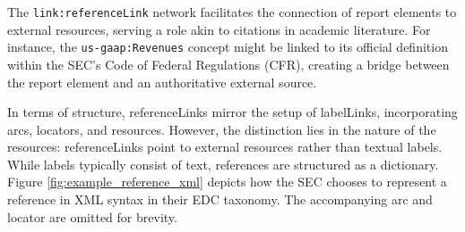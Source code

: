 


The \texttt{link:referenceLink} network facilitates the connection of report elements to external resources, serving a role akin to citations in academic literature.  
For instance, the \texttt{us-gaap:Revenues} concept might be linked to its official definition within the SEC's Code of Federal Regulations (CFR),  
creating a bridge between the report element and an authoritative external source.  

In terms of structure, referenceLinks mirror the setup of labelLinks, incorporating arcs, locators, and resources.  
However, the distinction lies in the nature of the resources: referenceLinks point to external resources rather than textual labels.  
While labels typically consist of text, references are structured as a dictionary.  
Figure \ref{fig:example_reference_xml} depicts how the SEC chooses to represent a reference in XML syntax in their EDC taxonomy\cite{sec_edc}.
The accompanying arc and locator are omitted for brevity.

